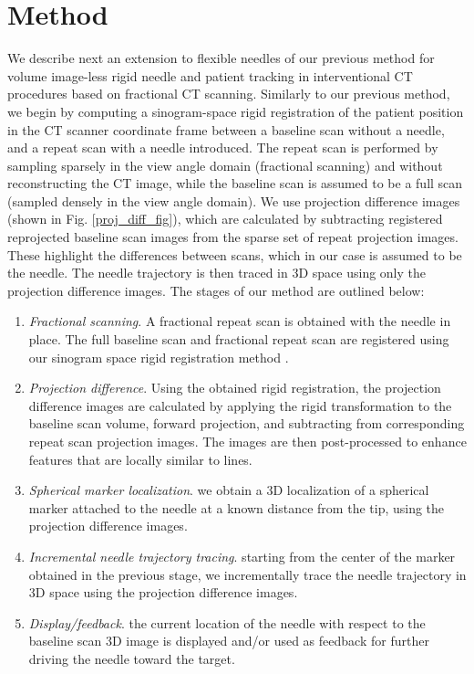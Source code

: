 \documentclass[letterpaper, 11 pt, conference]{ieeeconf} %
\begin{document}
\section{Method}

We describe next an extension to flexible needles of our previous method \cite{medan2017reduced} for volume image-less rigid needle and patient tracking in interventional CT procedures based on fractional CT scanning. Similarly to our previous method, we begin by computing a sinogram-space rigid registration of the patient position in the CT scanner coordinate frame between a baseline scan without a needle, and a repeat scan with a needle introduced. The repeat scan is performed by sampling sparsely in the view angle domain (fractional scanning) and without reconstructing the CT image, while the baseline scan is assumed to be a full scan (sampled densely in the view angle domain). We use projection difference images (shown in Fig. \ref{proj_diff_fig}), which are calculated by subtracting registered reprojected baseline scan images from the sparse set of repeat projection images. These highlight the differences between scans, which in our case is assumed to be the needle. The needle trajectory is then traced in 3D space using only the projection difference images. The stages of our method are outlined below:
\begin{enumerate}
\item \textit{Fractional scanning}. A fractional repeat scan is obtained with the needle in place. The full baseline scan and fractional repeat scan are registered using our sinogram space rigid registration method \cite{medan2017sparse}.
\item \textit{Projection difference}. Using the obtained rigid registration, the projection difference images are calculated by applying the rigid transformation to the baseline scan volume, forward projection, and subtracting from corresponding repeat scan projection images. The images are then post-processed to enhance features that are locally similar to lines.
\item \textit{Spherical marker localization}. we obtain a 3D localization of a spherical marker attached to the needle at a known distance from the tip, using the projection difference images.
\item \textit{Incremental needle trajectory tracing}. starting from the center of the marker obtained in the previous stage, we incrementally trace the needle trajectory in 3D space using the projection difference images.
\item \textit{Display/feedback}. the current location of the needle with respect to the baseline scan 3D image is displayed and/or used as feedback for further driving the needle toward the target.
\end{enumerate}
\end{document}
